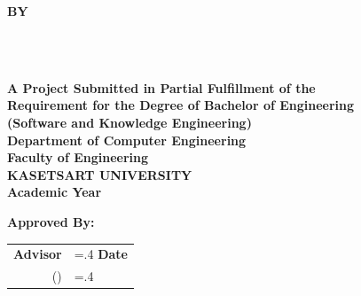 \thispagestyle{empty}
\begin{center}
    {\fontsize{22}{28}\selectfont\bfseries \usevar{\srsTitle}}\vspace{1in}

    {\fontsize{18}{24}\selectfont\bfseries BY}\vspace{.5in}

    {\fontsize{18}{24}\selectfont\bfseries%
        \usevar{\srsAuthorOne} \\
        \usevar{\srsAuthorTwo} \\
    }\vfill

    {\fontsize{13}{18}\selectfont\bfseries%
        A Project Submitted in Partial Fulfillment of the\\
        Requirement for the Degree of Bachelor of Engineering\\
        (Software and Knowledge Engineering)\\
        Department of Computer Engineering\\
        Faculty of Engineering\\
        KASETSART UNIVERSITY\\
        Academic Year \usevar{\srsAcademicYear}\\
    }
\end{center}

\vspace{.5in}

{\fontsize{13}{18}\selectfont\bfseries Approved By:}\vspace{.2in}

\begin{tabularx}{1\textwidth}{X >{\hsize=.4\hsize}X}
    \textbf{Advisor}\dotfill & \textbf{Date}\dotfill \\
    \multicolumn{1}{r}{(\usevar{\srsAdvisorName})} & \\[.1in]

\end{tabularx}

\restoregeometry
